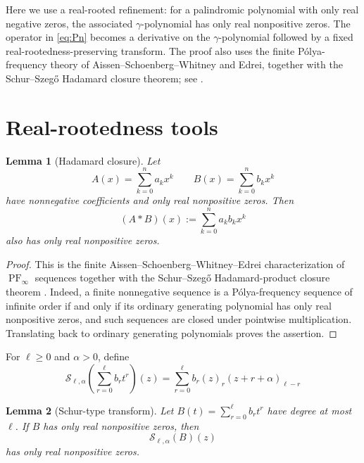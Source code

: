 \documentclass[a4paper,11pt,reqno]{amsart}
\numberwithin{equation}{section}
\newtheorem{lemma}{Lemma}
\theoremstyle{remark}
\DeclareMathOperator{\PF}{PF}
\begin{document}
Here we use a real-rooted refinement: for a palindromic polynomial with only real negative zeros, the associated \(\gamma\)-polynomial has only real nonpositive zeros. The operator in \eqref{eq:Pn} becomes a derivative on the \(\gamma\)-polynomial followed by a fixed real-rootedness-preserving transform. The proof also uses the finite P\'olya-frequency theory of Aissen--Schoenberg--Whitney and Edrei, together with the Schur--Szeg\H{o} Hadamard closure theorem; see \cite{AissenSchoenbergWhitney,Edrei,Brenti1989,Wagner1992}.

\section{Real-rootedness tools}

\begin{lemma}[Hadamard closure]\label{lem:pf}
Let
\[
  A(x)=\sum_{k=0}^{n}a_kx^k
  \qquad
  B(x)=\sum_{k=0}^{n}b_kx^k
\]
have nonnegative coefficients and only real nonpositive zeros. Then
\[
  (A*B)(x):=\sum_{k=0}^{n}a_kb_kx^k
\]
also has only real nonpositive zeros.
\end{lemma}

\begin{proof}
This is the finite Aissen--Schoenberg--Whitney--Edrei characterization of \(\PF_\infty\) sequences together with the Schur--Szeg\H{o} Hadamard-product closure theorem \cite{AissenSchoenbergWhitney,Edrei,Wagner1992}. Indeed, a finite nonnegative sequence is a P\'olya-frequency sequence of infinite order if and only if its ordinary generating polynomial has only real nonpositive zeros, and such sequences are closed under pointwise multiplication. Translating back to ordinary generating polynomials proves the assertion.
\end{proof}

For \(\ell\geq0\) and \(\alpha>0\), define
\begin{equation}\label{eq:L}
  \mathcal S_{\ell,\alpha}
  \left(\sum_{r=0}^{\ell}b_rt^r\right)(z)
  =
  \sum_{r=0}^{\ell}b_r(z)_r(z+r+\alpha)_{\ell-r}
\end{equation}

\begin{lemma}[Schur-type transform]\label{lem:schur}
Let \(B(t)=\sum_{r=0}^{\ell}b_rt^r\) have degree at most \(\ell\). If \(B\) has only real nonpositive zeros, then
\[
  \mathcal S_{\ell,\alpha}(B)(z)
\]
has only real nonpositive zeros.
\end{lemma}
\end{document}
